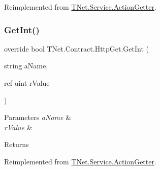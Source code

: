 Reimplemented from \mbox{\hyperlink{class_t_net_1_1_service_1_1_action_getter_a5e4ca4b5e0cd7bfcf76f96b6b546554a}{T\+Net.\+Service.\+Action\+Getter}}.

\mbox{\label{class_t_net_1_1_contract_1_1_http_get_afc5643a06ceca6ecba924888768a15c2}} 
\subsubsection{\texorpdfstring{Get\+Int()}{GetInt()}\hspace{0.1cm}{\footnotesize\ttfamily [4/5]}}
{\footnotesize\ttfamily override bool T\+Net.\+Contract.\+Http\+Get.\+Get\+Int (\begin{DoxyParamCaption}\item[{string}]{a\+Name,  }\item[{ref uint}]{r\+Value }\end{DoxyParamCaption})\hspace{0.3cm}{\ttfamily [virtual]}}






\begin{DoxyParams}{Parameters}
{\em a\+Name} & \\
\hline
{\em r\+Value} & \\
\hline
\end{DoxyParams}
\begin{DoxyReturn}{Returns}

\end{DoxyReturn}


Reimplemented from \mbox{\hyperlink{class_t_net_1_1_service_1_1_action_getter_af1ffcdde2c5c28dc8171ae816fb1aa25}{T\+Net.\+Service.\+Action\+Getter}}.

\mbox{\label{class_t_net_1_1_contract_1_1_http_get_aecdcc5039a14e65f1b7caad8667fa212}} 

